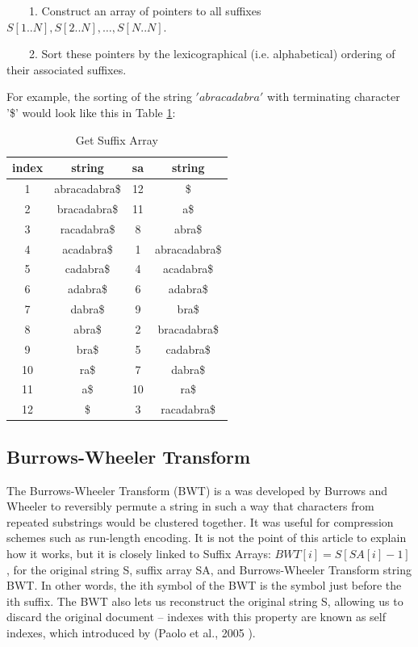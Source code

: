 \ \ \ \ 1. Construct an array of pointers to all suffixes \(S[1..N],S[2..N],…,S[N..N]\).

\ \ \ \ 2. Sort these pointers by the lexicographical (i.e. alphabetical) ordering of their associated suffixes.

For example, the sorting of the string \('abracadabra'\) with terminating character '\$' would look like this in Table \ref{ex:gsa}:

\begin{table}[!htp]
  \caption{Get Suffix Array}
  \label{ex:gsa}
  \begin{center}
    \begin{tabular}{c|c|c|c}
      \hline
      \hline
      index & string & sa & string \\
      \hline
      1 & abracadabra\$ & 12 & \$ \\
      \hline
      2 & bracadabra\$ & 11 & a\$ \\
      \hline
      3 & racadabra\$ & 8 & abra\$ \\
      \hline
      4 & acadabra\$ & 1 & abracadabra\$ \\
      \hline
      5 & cadabra\$ & 4 & acadabra\$ \\
      \hline
      6 & adabra\$ & 6 & adabra\$ \\
      \hline
      7 & dabra\$ & 9 & bra\$ \\
      \hline
      8 & abra\$ & 2 & bracadabra\$ \\
      \hline
      9 & bra\$ & 5 & cadabra\$ \\
      \hline
      10 & ra\$ & 7 & dabra\$ \\
      \hline
      11 & a\$ & 10 & ra\$ \\
      \hline
      12 & \$ & 3 & racadabra\$ \\
      \hline
    \end{tabular}
  \end{center}
\end{table}

\subsection{Burrows-Wheeler Transform}

The Burrows-Wheeler Transform (BWT) is a was developed by Burrows and Wheeler to reversibly permute a string in such a way that characters from repeated substrings would be clustered together. It was useful for compression schemes such as run-length encoding.
It is not the point of this article to explain how it works, but it is closely linked to Suffix Arrays: \(BWT[i] = S[SA[i] {-} 1]\), for the original string S, suffix array SA, and Burrows-Wheeler Transform string BWT. In other words, the ith symbol of the BWT is the symbol just before the ith suffix.
The BWT also lets us reconstruct the original string S, allowing us to discard the original document – indexes with this property are known as self indexes, which introduced by (Paolo et al., 2005 \cite{paolo2005}).

